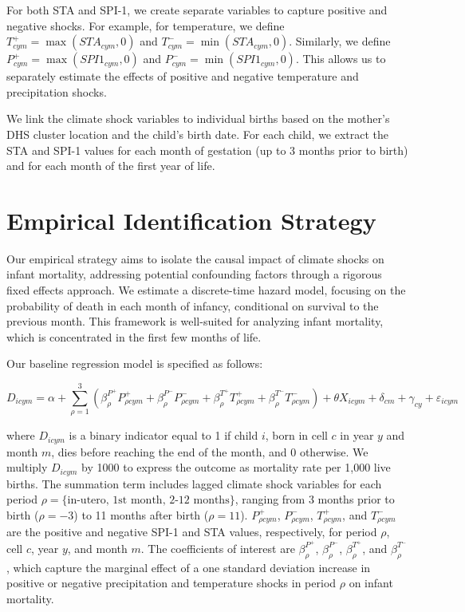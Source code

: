 \documentclass[12pt]{article}
\begin{document}
For both STA and SPI-1, we create separate variables to capture positive and negative shocks.  For example, for temperature, we define \(T^+_{cym} = \max(STA_{cym}, 0)\) and \(T^-_{cym} = \min(STA_{cym}, 0)\).  Similarly, we define \(P^+_{cym} = \max(SPI1_{cym}, 0)\) and \(P^-_{cym} = \min(SPI1_{cym}, 0)\). This allows us to separately estimate the effects of positive and negative temperature and precipitation shocks.

We link the climate shock variables to individual births based on the mother's DHS cluster location and the child's birth date.  For each child, we extract the STA and SPI-1 values for each month of gestation (up to 3 months prior to birth) and for each month of the first year of life.

\section{Empirical Identification Strategy} \label{sec:empirical}

Our empirical strategy aims to isolate the causal impact of climate shocks on infant mortality, addressing potential confounding factors through a rigorous fixed effects approach. We estimate a discrete-time hazard model, focusing on the probability of death in each month of infancy, conditional on survival to the previous month.  This framework is well-suited for analyzing infant mortality, which is concentrated in the first few months of life.

Our baseline regression model is specified as follows:

\begin{equation}
  D_{icym} = \alpha + \sum_{\rho = 1}^{3} \left( \beta^{P^+}_{\rho} P^+_{\rho cym} + \beta^{P^-}_{\rho} P^-_{\rho cym} + \beta^{T^+}_{\rho} T^+_{\rho cym} + \beta^{T^-}_{\rho} T^-_{\rho cym} \right) + \theta X_{icym} + \delta_{cm} + \gamma_{cy} + \varepsilon_{icym}
  \label{eq:main_model}
\end{equation}

where \(D_{icym}\) is a binary indicator equal to 1 if child \(i\), born in cell \(c\) in year \(y\) and month \(m\), dies before reaching the end of the month, and 0 otherwise.  We multiply \(D_{icym}\) by 1000 to express the outcome as mortality rate per 1,000 live births.  The summation term includes lagged climate shock variables for each period \(\rho=\{\text{in-utero, 1st month, 2-12 months}\}\), ranging from 3 months prior to birth (\(\rho = -3\)) to 11 months after birth (\(\rho = 11\)).  \(P^+_{\rho cym}\), \(P^-_{\rho cym}\), \(T^+_{\rho cym}\), and \(T^-_{\rho cym}\) are the positive and negative SPI-1 and STA values, respectively, for period \(\rho\), cell \(c\), year \(y\), and month \(m\).  The coefficients of interest are \(\beta^{P^+}_{\rho}\), \(\beta^{P^-}_{\rho}\), \(\beta^{T^+}_{\rho}\), and \(\beta^{T^-}_{\rho}\), which capture the marginal effect of a one standard deviation increase in positive or negative precipitation and temperature shocks in period \(\rho\) on infant mortality.
\end{document}
